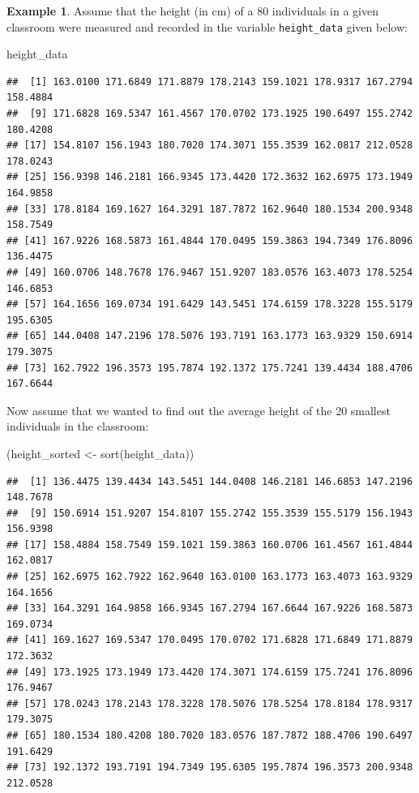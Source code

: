 \documentclass[
]{book}
\newenvironment{Shaded}{\begin{snugshade}}{\end{snugshade}}
\newcommand{\FunctionTok}[1]{\textcolor[rgb]{0.00,0.00,0.00}{#1}}
\newcommand{\NormalTok}[1]{#1}
\newcommand{\OtherTok}[1]{\textcolor[rgb]{0.56,0.35,0.01}{#1}}
\theoremstyle{definition}
\theoremstyle{definition}
\newtheorem{example}{Example}[chapter]
\theoremstyle{definition}
\theoremstyle{definition}
\theoremstyle{remark}
\begin{document}
\begin{example}

Assume that the height (in cm) of a 80 individuals in a given classroom were measured and recorded in the variable \texttt{height\_data} given below:

\begin{Shaded}
\begin{Highlighting}[]
\NormalTok{height\_data}
\end{Highlighting}
\end{Shaded}

\begin{verbatim}
##  [1] 163.0100 171.6849 171.8879 178.2143 159.1021 178.9317 167.2794 158.4884
##  [9] 171.6828 169.5347 161.4567 170.0702 173.1925 190.6497 155.2742 180.4208
## [17] 154.8107 156.1943 180.7020 174.3071 155.3539 162.0817 212.0528 178.0243
## [25] 156.9398 146.2181 166.9345 173.4420 172.3632 162.6975 173.1949 164.9858
## [33] 178.8184 169.1627 164.3291 187.7872 162.9640 180.1534 200.9348 158.7549
## [41] 167.9226 168.5873 161.4844 170.0495 159.3863 194.7349 176.8096 136.4475
## [49] 160.0706 148.7678 176.9467 151.9207 183.0576 163.4073 178.5254 146.6853
## [57] 164.1656 169.0734 191.6429 143.5451 174.6159 178.3228 155.5179 195.6305
## [65] 144.0408 147.2196 178.5076 193.7191 163.1773 163.9329 150.6914 179.3075
## [73] 162.7922 196.3573 195.7874 192.1372 175.7241 139.4434 188.4706 167.6644
\end{verbatim}

Now assume that we wanted to find out the average height of the 20 smallest individuals in the classroom:

\begin{Shaded}
\begin{Highlighting}[]
\NormalTok{(height\_sorted }\OtherTok{\textless{}{-}} \FunctionTok{sort}\NormalTok{(height\_data))}
\end{Highlighting}
\end{Shaded}

\begin{verbatim}
##  [1] 136.4475 139.4434 143.5451 144.0408 146.2181 146.6853 147.2196 148.7678
##  [9] 150.6914 151.9207 154.8107 155.2742 155.3539 155.5179 156.1943 156.9398
## [17] 158.4884 158.7549 159.1021 159.3863 160.0706 161.4567 161.4844 162.0817
## [25] 162.6975 162.7922 162.9640 163.0100 163.1773 163.4073 163.9329 164.1656
## [33] 164.3291 164.9858 166.9345 167.2794 167.6644 167.9226 168.5873 169.0734
## [41] 169.1627 169.5347 170.0495 170.0702 171.6828 171.6849 171.8879 172.3632
## [49] 173.1925 173.1949 173.4420 174.3071 174.6159 175.7241 176.8096 176.9467
## [57] 178.0243 178.2143 178.3228 178.5076 178.5254 178.8184 178.9317 179.3075
## [65] 180.1534 180.4208 180.7020 183.0576 187.7872 188.4706 190.6497 191.6429
## [73] 192.1372 193.7191 194.7349 195.6305 195.7874 196.3573 200.9348 212.0528
\end{verbatim}


\end{example}
\end{document}
